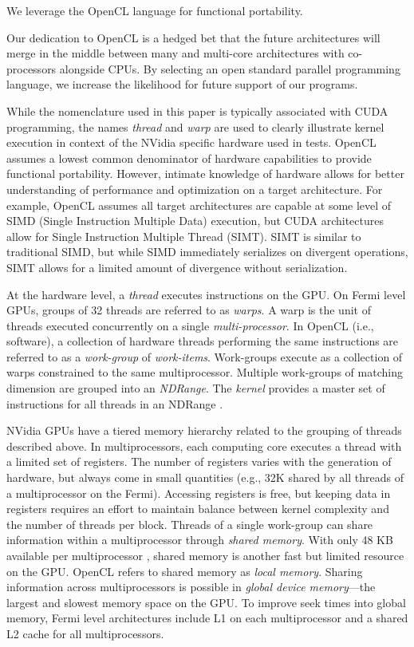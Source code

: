 \documentclass{report}
\begin{document}
We leverage the OpenCL language for functional portability. 

Our dedication to OpenCL is a hedged bet that the future architectures will merge in the middle between many and multi-core architectures with co-processors alongside CPUs. By selecting an open standard parallel programming language, we increase the likelihood for future support of our programs. 


While the nomenclature used in this paper is typically associated with CUDA programming, the names \textit{thread} and \textit{warp} are used to clearly illustrate kernel execution in context of the NVidia specific hardware used in tests. OpenCL assumes a lowest common denominator of hardware capabilities to provide functional portability. However, intimate knowledge of hardware allows for better understanding of performance and optimization on a target architecture. For example, OpenCL assumes all target architectures are capable at some level of SIMD (Single Instruction Multiple Data) execution, but CUDA architectures allow for Single Instruction Multiple Thread (SIMT). SIMT is similar to traditional SIMD, but while SIMD immediately serializes on divergent operations, SIMT allows for a limited amount of divergence without serialization. 

At the hardware level, a \textit{thread} executes instructions on the GPU. On Fermi level GPUs, groups of 32 threads are referred to as \textit{warps}. A warp is the unit of threads executed concurrently on a single \textit{multi-processor}. 
In OpenCL (i.e., software), a collection of hardware threads performing the same instructions are referred to as a \textit{work-group} of \textit{work-items}. Work-groups execute as a collection of warps constrained to the same multiprocessor. Multiple work-groups of matching dimension are grouped into an \textit{NDRange}. The \textit{kernel} provides a master set of instructions
for all threads in an NDRange \cite{OpenCL2009}. 


NVidia GPUs have a tiered memory hierarchy related to the grouping of threads described above. 
In multiprocessors, each computing core executes a thread with a limited set of registers. The number of registers varies with the generation of hardware, but always come in small quantities (e.g., 32K shared by all threads of a multiprocessor on the Fermi). Accessing registers is free, but keeping data in registers requires an effort to maintain balance between kernel complexity and the number of threads per block. Threads of a single work-group can share information within a multiprocessor through \textit{shared memory}. With only 48 KB 
available per 
multiprocessor \cite{CudaGuide2011}, shared memory is another fast but limited resource on the GPU. OpenCL refers to shared memory as \textit{local memory}. 
Sharing information across multiprocessors is possible in \textit{global device memory}---the largest and slowest memory space on the GPU. To improve seek times into global memory, Fermi level architectures include L1 on each multiprocessor and a shared L2 cache for all multiprocessors.
\end{document}
